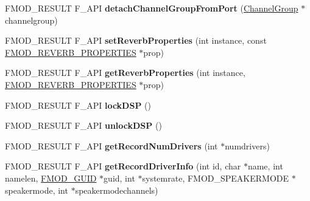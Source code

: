 \begin{DoxyCompactItemize}
\item 
\hypertarget{class_f_m_o_d_1_1_system_a47e2328d83db76cca6de74e188166937}{F\+M\+O\+D\+\_\+\+R\+E\+S\+U\+L\+T F\+\_\+\+A\+P\+I {\bfseries detach\+Channel\+Group\+From\+Port} (\hyperlink{class_f_m_o_d_1_1_channel_group}{Channel\+Group} $\ast$channelgroup)}\label{class_f_m_o_d_1_1_system_a47e2328d83db76cca6de74e188166937}

\item 
\hypertarget{class_f_m_o_d_1_1_system_abd46ed663c26bf687086c2992580a677}{F\+M\+O\+D\+\_\+\+R\+E\+S\+U\+L\+T F\+\_\+\+A\+P\+I {\bfseries set\+Reverb\+Properties} (int instance, const \hyperlink{struct_f_m_o_d___r_e_v_e_r_b___p_r_o_p_e_r_t_i_e_s}{F\+M\+O\+D\+\_\+\+R\+E\+V\+E\+R\+B\+\_\+\+P\+R\+O\+P\+E\+R\+T\+I\+E\+S} $\ast$prop)}\label{class_f_m_o_d_1_1_system_abd46ed663c26bf687086c2992580a677}

\item 
\hypertarget{class_f_m_o_d_1_1_system_a62268e4924d3543b9e25c1120ea62298}{F\+M\+O\+D\+\_\+\+R\+E\+S\+U\+L\+T F\+\_\+\+A\+P\+I {\bfseries get\+Reverb\+Properties} (int instance, \hyperlink{struct_f_m_o_d___r_e_v_e_r_b___p_r_o_p_e_r_t_i_e_s}{F\+M\+O\+D\+\_\+\+R\+E\+V\+E\+R\+B\+\_\+\+P\+R\+O\+P\+E\+R\+T\+I\+E\+S} $\ast$prop)}\label{class_f_m_o_d_1_1_system_a62268e4924d3543b9e25c1120ea62298}

\item 
\hypertarget{class_f_m_o_d_1_1_system_a3e214796058609cdf622c8be675f43a9}{F\+M\+O\+D\+\_\+\+R\+E\+S\+U\+L\+T F\+\_\+\+A\+P\+I {\bfseries lock\+D\+S\+P} ()}\label{class_f_m_o_d_1_1_system_a3e214796058609cdf622c8be675f43a9}

\item 
\hypertarget{class_f_m_o_d_1_1_system_a2caf736a103467e81ff40a34e9702423}{F\+M\+O\+D\+\_\+\+R\+E\+S\+U\+L\+T F\+\_\+\+A\+P\+I {\bfseries unlock\+D\+S\+P} ()}\label{class_f_m_o_d_1_1_system_a2caf736a103467e81ff40a34e9702423}

\item 
\hypertarget{class_f_m_o_d_1_1_system_a0729c552a7f61ddb37a81feb1469c9e8}{F\+M\+O\+D\+\_\+\+R\+E\+S\+U\+L\+T F\+\_\+\+A\+P\+I {\bfseries get\+Record\+Num\+Drivers} (int $\ast$numdrivers)}\label{class_f_m_o_d_1_1_system_a0729c552a7f61ddb37a81feb1469c9e8}

\item 
\hypertarget{class_f_m_o_d_1_1_system_a875f5264472ab6711c20984198f4e220}{F\+M\+O\+D\+\_\+\+R\+E\+S\+U\+L\+T F\+\_\+\+A\+P\+I {\bfseries get\+Record\+Driver\+Info} (int id, char $\ast$name, int namelen, \hyperlink{struct_f_m_o_d___g_u_i_d}{F\+M\+O\+D\+\_\+\+G\+U\+I\+D} $\ast$guid, int $\ast$systemrate, F\+M\+O\+D\+\_\+\+S\+P\+E\+A\+K\+E\+R\+M\+O\+D\+E $\ast$speakermode, int $\ast$speakermodechannels)}\label{class_f_m_o_d_1_1_system_a875f5264472ab6711c20984198f4e220}


\end{DoxyCompactItemize}
